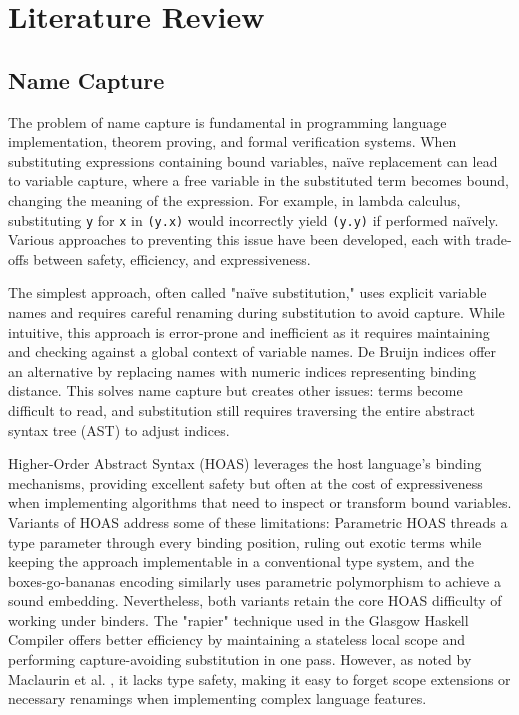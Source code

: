 \chapter{Literature Review}
\label{chap:lr}

\section{Name Capture}

The problem of name capture is fundamental in programming language implementation, theorem proving, and formal verification systems. 
When substituting expressions containing bound variables, naïve replacement can lead to variable capture, where a free variable in the substituted term becomes bound, changing the meaning of the expression. 
For example, in lambda calculus, substituting \texttt{y} for \texttt{x} in \texttt{(\textlambda y.x)} would incorrectly yield \texttt{(\textlambda y.y)} if performed naïvely. 
Various approaches to preventing this issue have been developed, each with trade-offs between safety, efficiency, and expressiveness.

The simplest approach, often called "naïve substitution," \cite{bound} uses explicit variable names and requires careful renaming during substitution to avoid capture. While intuitive, this approach is error-prone and inefficient as it requires maintaining and checking against a global context of variable names. De Bruijn indices \cite{deBruijn1972} offer an alternative by replacing names with numeric indices representing binding distance. This solves name capture but creates other issues: terms become difficult to read, and substitution still requires traversing the entire abstract syntax tree (AST) to adjust indices.

Higher-Order Abstract Syntax (HOAS) \cite{HOAS} leverages the host language's binding mechanisms, providing excellent safety but often at the cost of expressiveness when implementing algorithms that need to inspect or transform bound variables. 
Variants of HOAS address some of these limitations: Parametric HOAS \cite{phoas2008} threads a type parameter through every binding position, ruling out exotic terms while keeping the approach implementable in a conventional type system, and the boxes-go-bananas encoding \cite{boxesBananas2008} similarly uses parametric polymorphism to achieve a sound embedding. 
Nevertheless, both variants retain the core HOAS difficulty of working under binders. 
The "rapier" technique used in the Glasgow Haskell Compiler \cite{haskellCompilerSecrets} offers better efficiency by maintaining a stateless local scope and performing capture-avoiding substitution in one pass. However, as noted by Maclaurin et al. \cite{foil2023}, it lacks type safety, making it easy to forget scope extensions or necessary renamings when implementing complex language features.

